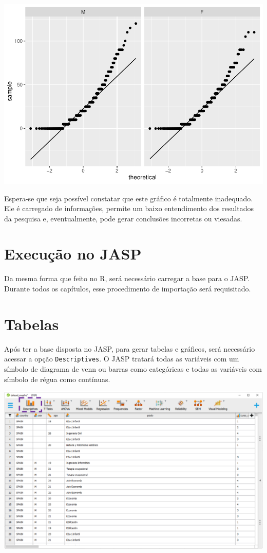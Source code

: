 \documentclass[
]{book}
\begin{document}
\begin{center}\includegraphics{gitbook-demo_files/figure-latex/unnamed-chunk-33-1} \end{center}

Espera-se que seja possível constatar que este gráfico é totalmente inadequado. Ele é carregado de informações, permite um baixo entendimento dos resultados da pesquisa e, eventualmente, pode gerar conclusões incorretas ou viesadas.

\hypertarget{execuuxe7uxe3o-no-jasp}{%
\section{Execução no JASP}\label{execuuxe7uxe3o-no-jasp}}

Da mesma forma que feito no R, será necessário carregar a base para o JASP. Durante todos os capítulos, esse procedimento de importação será requisitado.

\hypertarget{tabelas-1}{%
\section{Tabelas}\label{tabelas-1}}

Após ter a base disposta no JASP, para gerar tabelas e gráficos, será necessário acessar a opção \texttt{Descriptives}. O JASP tratará todas as variáveis com um símbolo de diagrama de venn ou barras como categóricas e todas as variáveis com símbolo de régua como contínuas.

\includegraphics{./img/cap_desc_jasp_descritivo.png}
\end{document}

